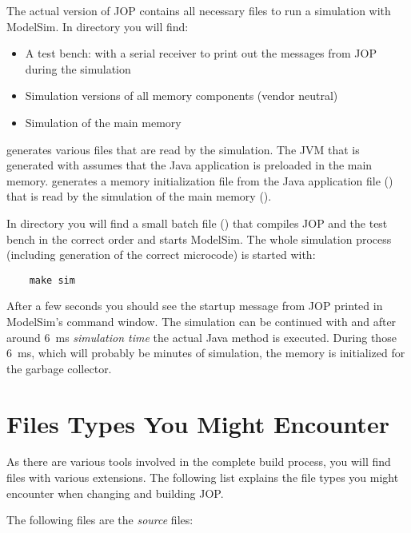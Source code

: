 The actual version of JOP contains all necessary files to run a
simulation with ModelSim. In directory  you
will find:
%
\begin{itemize}
    \item A test bench:  with a serial receiver to
    print out the messages from JOP during the simulation
    \item Simulation versions of all memory components (vendor neutral)
    \item Simulation of the main memory
\end{itemize}
%
 generates various  files that are read
by the simulation. The JVM that is generated with 
assumes that the Java application is preloaded in the main memory.
 generates a memory initialization file from the Java
application file () that is read by the
simulation of the main memory ().

In directory  you will find a small batch file
() that compiles JOP and the test bench in the correct
order and starts ModelSim. The whole simulation process (including
generation of the correct microcode) is started with:

\begin{lstlisting}
    make sim
\end{lstlisting}

After a few seconds you should see the startup message from JOP
printed in ModelSim's command window. The simulation can be continued
with  and after around 6~ms \emph{simulation time} the
actual Java  method is executed. During those 6~ms,
which will probably be minutes of simulation, the memory is
initialized for the garbage collector.

\section{Files Types You Might Encounter}

As there are various tools involved in the complete build process,
you will find files with various extensions. The following list
explains the file types you might encounter when changing and
building JOP.

The following files are the \emph{source} files:

